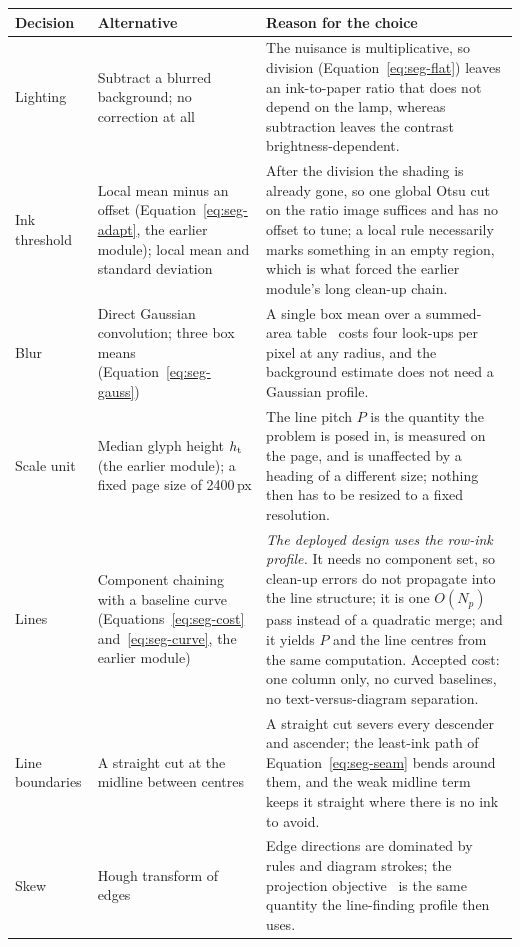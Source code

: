 \begin{table}[h]
\centering
\fontsize{9.5}{11.5}\selectfont
\begin{tabularx}{\linewidth}{|p{2.6cm}|X|X|}
\hline
\textbf{Decision} & \textbf{Alternative} & \textbf{Reason for the choice} \\
\hline
Lighting & Subtract a blurred background; no correction at all & The nuisance is multiplicative, so division (Equation~\ref{eq:seg-flat}) leaves an ink-to-paper ratio that does not depend on the lamp, whereas subtraction leaves the contrast brightness-dependent. \\
\hline
Ink threshold & Local mean minus an offset (Equation~\ref{eq:seg-adapt}, the earlier module); local mean and standard deviation~\cite{sauvola2000} & After the division the shading is already gone, so one global Otsu cut~\cite{otsu1979} on the ratio image suffices and has no offset to tune; a local rule necessarily marks something in an empty region, which is what forced the earlier module's long clean-up chain. \\
\hline
Blur & Direct Gaussian convolution; three box means (Equation~\ref{eq:seg-gauss}) & A single box mean over a summed-area table~\cite{crow1984} costs four look-ups per pixel at any radius, and the background estimate does not need a Gaussian profile. \\
\hline
Scale unit & Median glyph height $h_{\mathrm{t}}$ (the earlier module); a fixed page size of 2400\,px & The line pitch $P$ is the quantity the problem is posed in, is measured on the page, and is unaffected by a heading of a different size; nothing then has to be resized to a fixed resolution. \\
\hline
Lines & Component chaining with a baseline curve (Equations~\ref{eq:seg-cost} and~\ref{eq:seg-curve}, the earlier module) & \emph{The deployed design uses the row-ink profile.} It needs no component set, so clean-up errors do not propagate into the line structure; it is one $O(N_p)$ pass instead of a quadratic merge; and it yields $P$ and the line centres from the same computation. Accepted cost: one column only, no curved baselines, no text-versus-diagram separation. \\
\hline
Line boundaries & A straight cut at the midline between centres & A straight cut severs every descender and ascender; the least-ink path of Equation~\ref{eq:seg-seam} bends around them, and the weak midline term keeps it straight where there is no ink to avoid. \\
\hline
Skew & Hough transform of edges~\cite{duda1972} & Edge directions are dominated by rules and diagram strokes; the projection objective~\cite{postl1986} is the same quantity the line-finding profile then uses. \\

\end{tabularx}
\end{table}
